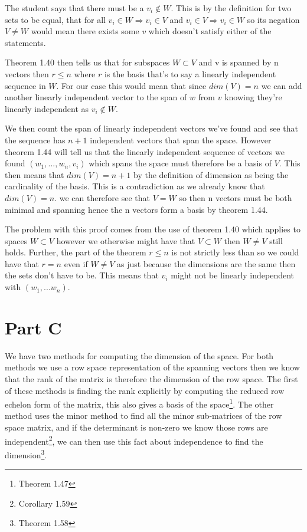 \documentclass{article}
\begin{document}
The student says that there must be a $v_i \notin W$. 
This is by the definition for two sets to be equal, that for all $v_i \in W \Rightarrow v_i \in V$ and 
$v_i \in V \Rightarrow v_i \in W$ 
so its negation $V \neq W$ would mean there exists some $v$ which doesn't satisfy either of the statements. 

Theorem 1.40 then tells us that for subspaces $W \subset V$ and v is spanned by n vectors then $r\leq n$ where $r$ is the basis that's to say a linearly independent sequence in $W$. For our case this would mean that since 
$dim(V) = n$ we can add another linearly independent vector to the span of $w$ from $v$ knowing they're linearly independent as 
$v_i \notin W$.

We then count the span of linearly independent vectors we've found and see that the sequence has $n+1$ independent vectors that span the space. However theorem 1.44 will tell us that the linearly independent sequence of vectors we found $(w_1,...,w_n,v_i)$ which spans the space must therefore be a basis of $V$. This then means that $dim(V) = n+1$ by the definition of dimension as being the cardinality of the basis. This is a contradiction as we already know that $dim(V) = n$. we can therefore see that $V=W$ so then n vectors must be both minimal and spanning hence the n vectors form a basis by theorem 1.44.

The problem with this proof comes from the use of theorem 1.40 which applies to spaces $W \subset V$ however we otherwise might have that $V \subset W$ then $W\neq V$ still holds. Further, the part of the theorem $r \leq n$ is not strictly less than so we could have that $r = n$ even if $W\neq V$ as just because the dimensions are the same then the sets don't have to be. This means that $v_i$ might not be linearly independent with $(w_1,...w_n)$.

\break

\section{Part C}
We have two methods for computing the dimension of the space. For both methods we use a row space representation of the spanning vectors then we know that the rank of the matrix is therefore the dimension of the row space\cite{Johnson}.
The first of these methods is finding the rank explicitly by computing the reduced row echelon form of the matrix, this also gives a basis of the space\footnote{Theorem 1.47}. 
The other method uses the minor method to find all the minor sub-matrices of the row space matrix, and if the determinant is non-zero we know those rows are independent\footnote{Corollary 1.59}, we can then use this fact about independence to find the dimension\footnote{Theorem 1.58}.
\end{document}
